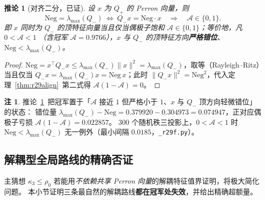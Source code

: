 \documentclass[UTF8,11pt]{ctexart}
\newtheorem{corollary}[theorem]{推论}
\theoremstyle{definition}
\newtheorem{remark}[theorem]{注}
\begin{document}
\begin{corollary}[对齐二分，已证]\label{cor:r29dich}
设 $x$ 为 $Q_+$ 的 Perron 向量，则
\[
\mathrm{Neg}=\lambda_{\max}(Q_-)\ \Longleftrightarrow\ Q_-x=\mathrm{Neg}\cdot x
\quad\Longrightarrow\quad \mathcal A\in\{0,1\}.
\]
即 $x$ 同时为 $Q_-$ 的顶特征向量当且仅当偶极子饱和 $\mathcal A\in\{0,1\}$；等价地，凡 $0<\mathcal A<1$
（含冠军 $\mathcal A=0.9766$），$x$ 与 $Q_-$ 的顶特征方向\textbf{严格错位}、$\mathrm{Neg}<\lambda_{\max}(Q_-)$。
\end{corollary}
\begin{proof}
$\mathrm{Neg}=x^\top Q_-x\le\lambda_{\max}(Q_-)\|x\|^2=\lambda_{\max}(Q_-)$，取等（Rayleigh--Ritz）当且仅当
$Q_-x=\lambda_{\max}(Q_-)x=\mathrm{Neg}\,x$；此时 $\|Q_-x\|^2=\mathrm{Neg}^2$，代入定理~\ref{thm:r29align}~第二式得 $\mathcal A(1-\mathcal A)=0$。
\end{proof}
\begin{remark}
推论~\ref{cor:r29dich}~把冠军置于「$\mathcal A$ 接近 $1$ 但严格小于 $1$、$x$ 与 $Q_-$ 顶方向轻微错位」的状态：
错位量 $\lambda_{\max}(Q_-)-\mathrm{Neg}=0.379920-0.304973=0.074947$，正对应偶极子亏损 $\mathcal A(1-\mathcal A)=0.022857$。
$300$ 个随机秩三投影上，$0<\mathcal A<1$ 时 $\mathrm{Neg}<\lambda_{\max}(Q_-)$ 无一例外（最小间隔 $0.0185$，\texttt{\_r29f.py}）。
\end{remark}

\subsection{解耦型全局路线的精确否证}\label{sec:r29:weyl}

主猜想 $\kappa_3\le\rho_0$ 若能用\emph{不依赖共享 Perron 向量}的解耦特征值界证明，将极大简化问题。
本小节证明三条最自然的解耦路线\textbf{都在冠军处失效}，并给出精确超额量。
\end{document}
